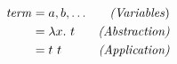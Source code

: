 \begin{minipage}{2in}
  \begin{equation*}
    \begin{aligned}
      \mathit{term} &= a, b, \ldots & \text{\emph{(Variables})} \\ &=
      \lambda x.\ t & \text{\emph{(Abstraction)}} \\ &= t\ t
      & \text{\emph{(Application)}}
    \end{aligned}
  \end{equation*}
\end{minipage}
